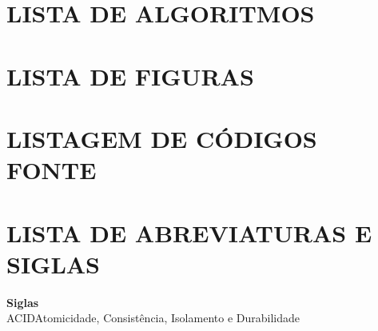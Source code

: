 	\section*{\centering \small\bfseries LISTA DE ALGORITMOS}
	
	\newpage
	\section*{\centering \small\bfseries LISTA DE FIGURAS}
	
	\newpage
	\section*{\centering \small\bfseries LISTAGEM DE CÓDIGOS FONTE}
	
	\newpage
	\section*{\centering \small\bfseries LISTA DE ABREVIATURAS E SIGLAS}
	\textbf{Siglas}\\
	
	\noindent
	ACID\hspace{1cm}Atomicidade, Consistência, Isolamento e Durabilidade
	\clearpage
	
	\renewcommand{\cftdotsep}{1}
	
	\renewcommand{\contentsname}{\MakeUppercase{Sumário}}
	\renewcommand{\cfttoctitlefont}{\bfseries\small} %
	\renewcommand{\cftaftertoctitle}{\hfill\par}           %
	\renewcommand{\cftchapfont}{\bfseries}
	\renewcommand{\cftchappagefont}{\bfseries}
	
	\renewcommand{\cftsecfont}{\bfseries}
	\renewcommand{\cftsecpagefont}{\bfseries}
	
	\renewcommand{\cftsubsecfont}{\bfseries}
	\renewcommand{\cftsubsecpagefont}{\bfseries}
	
	\setlength{\cftbeforetoctitleskip}{0pt}
	\setlength{\cftaftertoctitleskip}{2ex}
	
	
	\setcounter{tocdepth}{2}
	\tableofcontents
	\newpage
	
